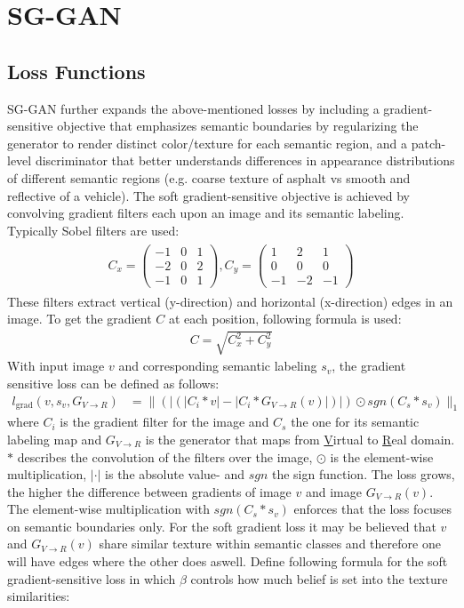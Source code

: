 \section{SG-GAN}

\subsection{Loss Functions}
SG-GAN \cite{DBLP:journals/corr/abs-1801-01726} further expands the above-mentioned losses by including a gradient-sensitive objective that emphasizes semantic boundaries by regularizing the generator to render distinct color/texture for each semantic region, and a patch-level discriminator that better understands differences in appearance distributions of different semantic regions (e.g. coarse texture of asphalt vs smooth and reflective of a vehicle). The soft gradient-sensitive objective is achieved by convolving gradient filters each upon an image and its semantic labeling. Typically Sobel filters are used:
\begin{align}
	\begin{array}{cc}
		C_x = 
		\begin{pmatrix}
			-1 & 0 & 1\\
			-2 & 0 & 2\\
			-1 & 0 & 1
		\end{pmatrix},
		C_y = 
		\begin{pmatrix}
			1 & 2 & 1\\
			0 & 0 & 0\\
			-1 & -2 & -1
		\end{pmatrix}
	\end{array}
	\label{eq:sobel}
\end{align}
These filters extract vertical (y-direction) and horizontal (x-direction) edges in an image. To get the gradient $C$ at each position, following formula is used:
\begin{align}
	C = \sqrt{C_x^2 + C_y^2}
\end{align}
With input image $v$ and corresponding semantic labeling $s_v$, the gradient sensitive loss can be defined as follows:
\begin{align}
		l_{\text{grad}}(v,s_v,G_{V\rightarrow R}) &= \lVert(|(|C_i * v |-|C_i*G_{V\rightarrow R}(v)|)|) \odot sgn(C_s*s_v)\rVert_1
\end{align}
where $C_i$ is the gradient filter for the image and $C_s$ the one for its semantic labeling map and $G_{V\rightarrow R}$ is the generator that maps from \underline{V}irtual to \underline{R}eal domain. $*$ describes the convolution of the filters over the image, $\odot$ is the element-wise multiplication, $|\cdot|$ is the absolute value- and $sgn$ the sign function. The loss grows, the higher the difference between gradients of image $v$ and image $G_{V\rightarrow R}(v)$. The element-wise multiplication with $sgn(C_s * s_v)$ enforces that the loss focuses on semantic boundaries only. For the soft gradient loss it may be believed that $v$ and $G_{V\rightarrow R}(v)$ share similar texture within semantic classes and therefore one will have edges where the other does aswell. Define following formula for the soft gradient-sensitive loss in which $\beta$ controls how much belief is set into the texture similarities:
